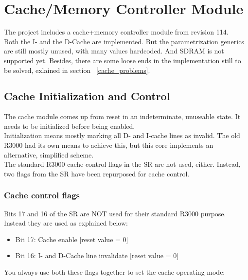 \chapter{Cache/Memory Controller Module}
\label{cache}

    The project includes a cache+memory controller module from revision 114.\\
        
    Both the I- and the D-Cache are implemented. But the parametrization 
    generics are still mostly unused, with many values hardcoded. And SDRAM is 
    not supported yet. Besides, there are some loose ends in the implementation 
    still to be solved, exlained in section ~\ref{cache_problems}.\\
    
    
\section{Cache Initialization and Control}
\label{cache_init_and_control}

    The cache module comes up from reset in an indeterminate, unuseable state.
    It needs to be initialized before being enabled.\\
    Initialization means mostly marking all D- and I-cache lines as invalid. 
    The old R3000 had its own means to achieve this, but this core implements an
    alternative, simplified scheme.\\

    The standard R3000 cache control flags in the SR are not used, either. Instead,
    two flags from the SR have been repurposed for cache control.\\

\subsection{Cache control flags}
\label{cache_control_flags}
    
    Bits 17 and 16 of the SR are NOT used for their standard R3000 purpose.
    Instead they are used as explained below:
    
    \begin{itemize}
    \item Bit 17: Cache enable              [reset value = 0]
    \item Bit 16: I- and D-Cache line invalidate   [reset value = 0]
    \end{itemize}

    You always use both these flags together to set the cache operating mode:
    
